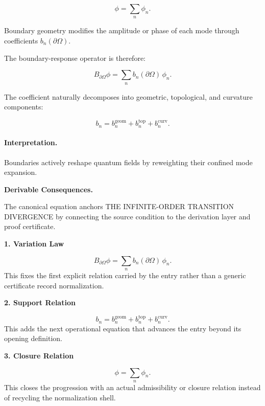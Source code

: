 \begin{equation}
\phi=\sum_n \phi_n .
\end{equation}

Boundary geometry modifies the amplitude or phase of each mode through coefficients $b_n(\partial\Omega)$.

The boundary-response operator is therefore:

\begin{equation}
\boxed{
B_{\partial\Omega}\phi
=
\sum_n b_n(\partial\Omega)\,\phi_n .
}
\end{equation}

The coefficient naturally decomposes into geometric, topological, and curvature components:

\begin{equation}
b_n
=
b_n^{\mathrm{geom}}
+
b_n^{\mathrm{top}}
+
b_n^{\mathrm{curv}} .
\end{equation}

\paragraph{Interpretation.}
Boundaries actively reshape quantum fields by reweighting their confined mode expansion.

\par\vspace{0.35em}
\noindent\textbf{Derivable Consequences.}\quad
\begingroup
\footnotesize
\raggedright
The canonical equation anchors THE INFINITE-ORDER TRANSITION DIVERGENCE by connecting the source condition to the derivation layer and proof certificate.
\par\endgroup

\noindent\textbf{1. Variation Law}\par
\[
B_{\partial\Omega}\phi = \sum_n b_n(\partial\Omega)\,\phi_n.
\]
\noindent This fixes the first explicit relation carried by the entry rather than a generic certificate record normalization.\par
\noindent\textbf{2. Support Relation}\par
\[
b_n = b_n^{\mathrm{geom}} + b_n^{\mathrm{top}} + b_n^{\mathrm{curv}}.
\]
\noindent This adds the next operational equation that advances the entry beyond its opening definition.\par
\noindent\textbf{3. Closure Relation}\par
\[
\phi=\sum_n \phi_n.
\]
\noindent This closes the progression with an actual admissibility or closure relation instead of recycling the normalization shell.\par


